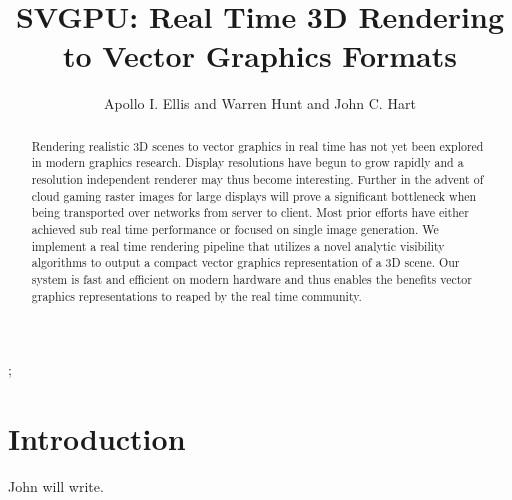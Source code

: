 \documentclass[review]{acmsiggraph}
\title{SVGPU: Real Time 3D Rendering to Vector Graphics Formats}
\author{Apollo I. Ellis and Warren Hunt and John C. Hart}
\begin{document}

 \teaser{
 }

\maketitle

\begin{abstract}

Rendering realistic 3D scenes to vector graphics in real time has not yet been explored in modern graphics research. Display resolutions have begun to grow rapidly and a resolution independent renderer may thus become interesting. Further in the advent of cloud gaming raster images for large displays will prove a significant bottleneck when being transported over networks from server to client.  Most prior efforts have either achieved sub real time performance or focused on single image generation. We implement a real time rendering pipeline that utilizes a novel analytic visibility algorithms to output a compact vector graphics representation of a 3D scene. Our system is fast and efficient on modern hardware and thus enables the benefits vector graphics representations to reaped by the real time community.

\end{abstract}

\begin{CRcatlist}
  ;
\end{CRcatlist}

\keywordlist


\copyrightspace

\section{Introduction}
John will write.
\end{document}
